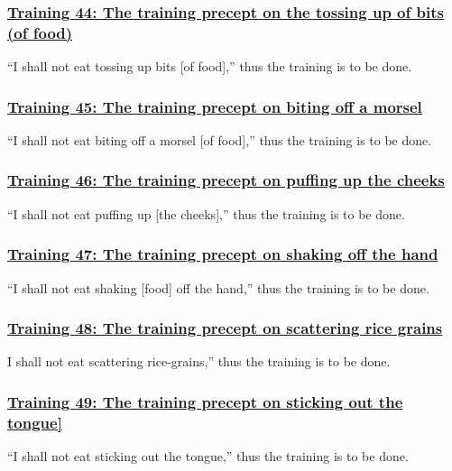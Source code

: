 \subsubsection*{\hyperref[sekh44]{Training 44: The training precept on the tossing up of bits (of food)}}
\label{training44}
``I shall not eat tossing up bits [of food],'' thus the training is to be done.



\subsubsection*{\hyperref[sekh45]{Training 45: The training precept on biting off a morsel}}
\label{training45}
``I shall not eat biting off a morsel [of food],'' thus the training is to be done.



\subsubsection*{\hyperref[sekh46]{Training 46: The training precept on puffing up the cheeks}}
\label{training46}
``I shall not eat puffing up [the cheeks],'' thus the training is to be done.



\subsubsection*{\hyperref[sekh47]{Training 47: The training precept on shaking off the hand}}
\label{training47}
``I shall not eat shaking [food] off the hand,'' thus the training is to be done.



\subsubsection*{\hyperref[sekh48]{Training 48: The training precept on scattering rice grains}}
\label{training48}
I shall not eat scattering rice-grains,'' thus the training is to be done.



\subsubsection*{\hyperref[sekh49]{Training 49: The training precept on sticking out the tongue]}}
\label{training49}
``I shall not eat sticking out the tongue,'' thus the training is to be done.



